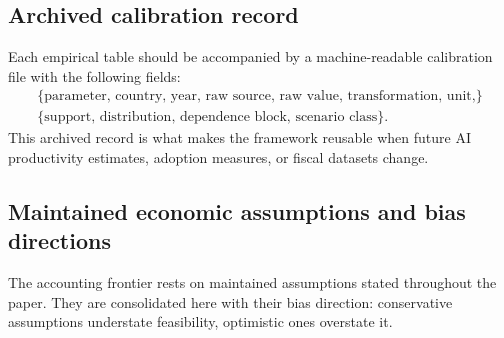 \documentclass[11pt,a4paper]{article}
\begin{document}
\subsection{Archived calibration record}

Each empirical table should be accompanied by a machine-readable calibration file with the following fields:
\begin{equation}
\begin{gathered}
    \{\text{parameter, country, year, raw source, raw value, transformation, unit,}\}\\
    \{\text{support, distribution, dependence block, scenario class}\}.
\end{gathered}
\end{equation}
This archived record is what makes the framework reusable when future AI productivity estimates, adoption measures, or fiscal datasets change.


\subsection{Maintained economic assumptions and bias directions}

The accounting frontier rests on maintained assumptions stated throughout the paper. They are consolidated here with their bias direction: conservative assumptions understate feasibility, optimistic ones overstate it.
\end{document}
